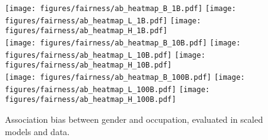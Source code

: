 
\begin{figure*}[t!]
    \centering
    \texttt{[image: figures/fairness/ab\_heatmap\_B\_1B.pdf]}
    \texttt{[image: figures/fairness/ab\_heatmap\_L\_1B.pdf]}
    \texttt{[image: figures/fairness/ab\_heatmap\_H\_1B.pdf]}\\
    \texttt{[image: figures/fairness/ab\_heatmap\_B\_10B.pdf]}
    \texttt{[image: figures/fairness/ab\_heatmap\_L\_10B.pdf]}
    \texttt{[image: figures/fairness/ab\_heatmap\_H\_10B.pdf]}\\
    \texttt{[image: figures/fairness/ab\_heatmap\_B\_100B.pdf]}
    \texttt{[image: figures/fairness/ab\_heatmap\_L\_100B.pdf]}
    \texttt{[image: figures/fairness/ab\_heatmap\_H\_100B.pdf]}
    \caption{Association bias between gender and occupation, evaluated in scaled models and data.}
    \label{fig:ab}
\end{figure*}
